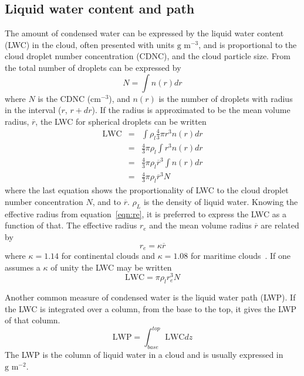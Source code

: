 \subsection{Liquid water content and path}
\label{subsec:lwc}
The amount of condensed water can be expressed by the liquid water content (LWC) in the cloud, often presented with units $\text{g~m}^{-3}$, and is proportional to the cloud droplet number concentration (CDNC), and the cloud particle size. From~\citet{Rogers1989} the total number of droplets can be expressed by
\begin{equation}
N = \int n(r) dr
\end{equation}
where $N$ is the CDNC ($\text{cm}^{-3}$), and $n(r)$ is the number of droplets with radius in the interval ($r$, $r + dr$). If the radius is approximated to be the mean volume radius, $\overline{r}$, the LWC for spherical droplets can be written
\begin{eqnarray}
\text{LWC} &=& \int \rho_l \frac{4}{3} \pi r^3 n(r) dr\\
&=& \frac{4}{3} \pi \rho_l \int r^3 n(r) dr\\
&=& \frac{4}{3} \pi \rho_l \overline{r}^3 \int n(r) dr\\
&=& \frac{4}{3} \pi \rho_l \overline{r}^3 N 
\end{eqnarray}
where the last equation shows the proportionality of LWC to the cloud droplet number concentration $N$, and to $\overline{r}$. $\rho_L$ is the density of liquid water. Knowing the effective radius from equation~\ref{eqn:re}, it is preferred to express the LWC as a function of that. The effective radius $r_e$ and the mean volume radius $\overline{r}$ are related by
\begin{equation}
r_e = \kappa \overline{r}
\end{equation}
where $\kappa = 1.14$ for continental clouds and $\kappa = 1.08$ for maritime clouds~\citep{Martin1994}. If one assumes a $\kappa$ of unity the LWC may be written
\begin{equation}
\text{LWC} = \pi \rho_l r_e^3 N
\label{eqn:LWC}
\end{equation}

Another common measure of condensed water is the liquid water path (LWP).
If the LWC is integrated over a column, from the base to the top, it gives the LWP of that column.
\begin{equation}
\text{LWP} = \int_{base}^{top} \text{LWC} dz
\end{equation}
The LWP is the column of liquid water in a cloud and is usually expressed in $\text{g~m}^{-2}$.

